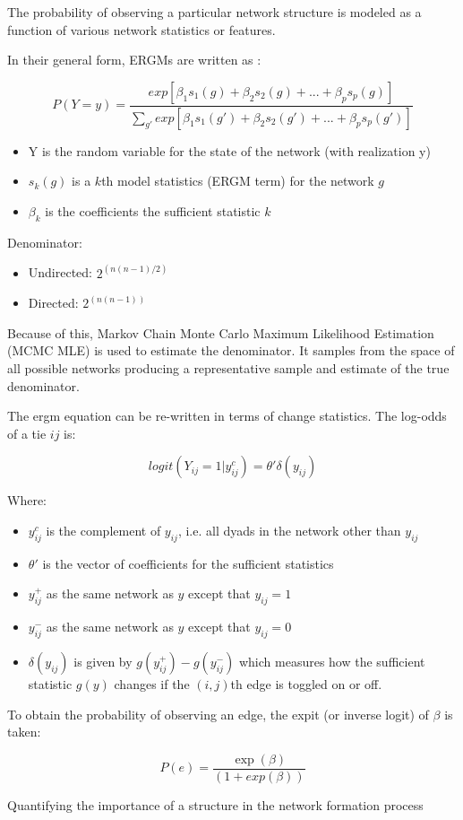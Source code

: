 The probability of observing a particular network structure is modeled as a function of various network statistics or features.

In their general form, ERGMs are written as \citep{hunter2008}:

$$
P(Y=y) = \frac{exp[\beta_1 s_1(g) + \beta_2 s_2(g) + ... + \beta_p s_p(g)]}{\sum\limits_{g'} exp[\beta_1 s_1(g') + \beta_2 s_2(g') + ... + \beta_p s_p(g')]}
$$

\begin{itemize}
    \item Y is the random variable for the state of the network (with realization y)
    \item $s_k(g)$ is a $k$th model statistics (ERGM term) for the network $g$
    \item $\beta_k$ is the coefficients the sufficient statistic $k$
\end{itemize}

\break

Denominator:

\begin{itemize}
	\item Undirected: $2^{(n(n-1)/2)}$ 
	\item Directed: $2^{(n(n-1))}$
\end{itemize}

Because of this, Markov Chain Monte Carlo Maximum Likelihood Estimation (MCMC MLE) is used to estimate the denominator. It samples from the space of all possible networks producing a representative sample and estimate of the true denominator. 

\break

The ergm equation can be re-written in terms of change statistics. The log-odds of a tie $ij$ is:

$$
logit(Y_{ij} = 1 | y_{ij}^c) = \theta' \delta(y_{ij})
$$

Where:
\begin{itemize}
	\item $y_{ij}^c$ is the complement of $y_{ij}$, i.e. all dyads in the network other than $y_{ij}$
	\item $\theta'$ is the vector of coefficients for the sufficient statistics
	\item $y_{ij}^+$ as the same network as $y$ except that $y_{ij} = 1$
	\item $y_{ij}^-$ as the same network as $y$ except that $y_{ij} = 0$
	\item $\delta(y_{ij})$ is given by $g(y_{ij}^+) - g(y_{ij}^-)$ which measures how the sufficient 
	statistic $g(y)$ changes if the $(i, j)$th edge is toggled on or off.
\end{itemize}

To obtain the probability of observing an edge, the expit (or inverse logit) of $\beta$ is taken:

$$
P(e) = \frac{\exp(\beta)}{(1 + exp(\beta))}
$$

Quantifying the importance of a structure in the network formation process
















